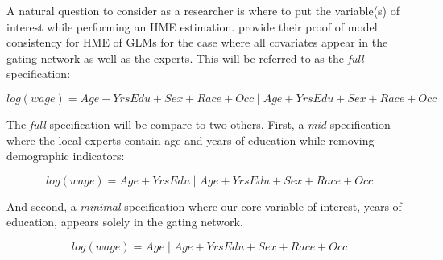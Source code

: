 \documentclass[12pt]{article}
\theoremstyle{definition}
\begin{document}
\bigskip

A natural question to consider as a researcher is where to put the variable(s)
of interest while performing an HME estimation. \citet{JiangTanner2000}
provide their proof of model consistency for HME of GLMs for the case where
all covariates appear in the gating network as well as the experts. This will
be referred to as the \textit{full} specification:

\begin{equation} \label{eq:full_formula}
  log(wage) = Age + YrsEdu + Sex +  Race + Occ \; | \; Age + YrsEdu + Sex +  Race + Occ
\end{equation}

The \textit{full} specification will be compare to two others.
First, a \textit{mid} specification where the local experts contain age and
years of education while removing demographic indicators:

\begin{equation} \label{eq:mid_formula}
  log(wage) = Age + YrsEdu \; | \; Age + YrsEdu + Sex +  Race + Occ
\end{equation}

And second, a \textit{minimal} specification where our core variable
of interest, years of education, appears solely in the gating network.

\begin{equation} \label{eq:min_formula}
  log(wage) = Age \; | \; Age + YrsEdu + Sex +  Race + Occ
\end{equation}
\end{document}
